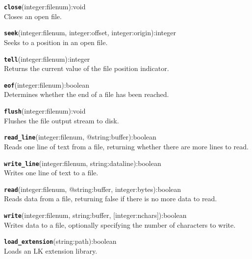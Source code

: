 \hrulefill

\texttt{{\large\textbf{close}}}\textsf{(integer:filenum):void}\\
 Closes an open file.

\hrulefill

\texttt{{\large\textbf{seek}}}\textsf{(integer:filenum, integer:offset, integer:origin):integer}\\
 Seeks to a position in an open file.

\hrulefill

\texttt{{\large\textbf{tell}}}\textsf{(integer:filenum):integer}\\
 Returns the current value of the file position indicator.

\hrulefill

\texttt{{\large\textbf{eof}}}\textsf{(integer:filenum):boolean}\\
 Determines whether the end of a file has been reached.

\hrulefill

\texttt{{\large\textbf{flush}}}\textsf{(integer:filenum):void}\\
 Flushes the file output stream to disk.

\hrulefill

\texttt{{\large\textbf{read\_line}}}\textsf{(integer:filenum, @string:buffer):boolean}\\
 Reads one line of text from a file, returning whether there are more lines to read.

\hrulefill

\texttt{{\large\textbf{write\_line}}}\textsf{(integer:filenum, string:dataline):boolean}\\
 Writes one line of text to a file.

\hrulefill

\texttt{{\large\textbf{read}}}\textsf{(integer:filenum, @string:buffer, integer:bytes):boolean}\\
 Reads data from a file, returning false if there is no more data to read.

\hrulefill

\texttt{{\large\textbf{write}}}\textsf{(integer:filenum, string:buffer, [integer:nchars]):boolean}\\
 Writes data to a file, optionally specifying the number of characters to write.

\hrulefill

\texttt{{\large\textbf{load\_extension}}}\textsf{(string:path):boolean}\\
 Loads an LK extension library.

